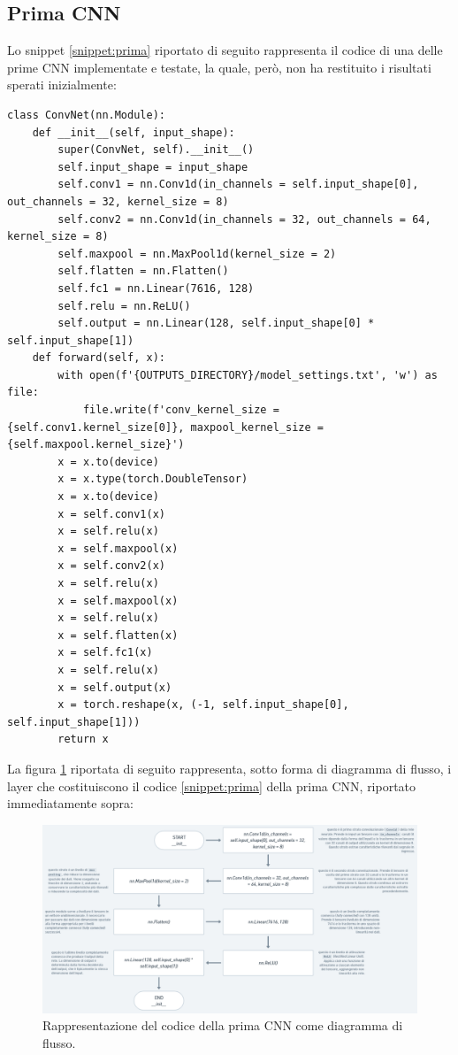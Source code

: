 \subsection{Prima CNN}
\label{subsec:prima}

Lo snippet \ref{snippet:prima} riportato di seguito rappresenta il codice di una delle prime CNN implementate e testate, la quale, però, non ha restituito i risultati sperati inizialmente:

\lstset{language=Python}
\begin{lstlisting}[aboveskip=15pt, belowskip=15pt, basicstyle=\fontsize{8}{10}\selectfont, keywordstyle=\color{blue}, breaklines=true, label=snippet:prima]
class ConvNet(nn.Module):
    def __init__(self, input_shape):
        super(ConvNet, self).__init__()
        self.input_shape = input_shape
        self.conv1 = nn.Conv1d(in_channels = self.input_shape[0], out_channels = 32, kernel_size = 8)
        self.conv2 = nn.Conv1d(in_channels = 32, out_channels = 64, kernel_size = 8)
        self.maxpool = nn.MaxPool1d(kernel_size = 2)
        self.flatten = nn.Flatten()
        self.fc1 = nn.Linear(7616, 128)
        self.relu = nn.ReLU()
        self.output = nn.Linear(128, self.input_shape[0] * self.input_shape[1])
    def forward(self, x):
        with open(f'{OUTPUTS_DIRECTORY}/model_settings.txt', 'w') as file:
            file.write(f'conv_kernel_size = {self.conv1.kernel_size[0]}, maxpool_kernel_size = {self.maxpool.kernel_size}')
        x = x.to(device)
        x = x.type(torch.DoubleTensor)
        x = x.to(device)
        x = self.conv1(x)
        x = self.relu(x)
        x = self.maxpool(x)
        x = self.conv2(x)
        x = self.relu(x)
        x = self.maxpool(x)
        x = self.relu(x)
        x = self.flatten(x)
        x = self.fc1(x)
        x = self.relu(x)
        x = self.output(x)
        x = torch.reshape(x, (-1, self.input_shape[0], self.input_shape[1]))
        return x
\end{lstlisting}

La figura \ref{fig:prima} riportata di seguito rappresenta, sotto forma di diagramma di flusso, i layer che costituiscono il codice \ref{snippet:prima} della prima CNN, riportato immediatamente sopra:

\begin{figure}[H]
    \centering
    \includegraphics[width=1\textwidth]{immagini/prima.png}
    \captionsetup{justification=centering}
    \caption{Rappresentazione del codice della prima CNN come diagramma di flusso.}
    \label{fig:prima}
\end{figure}

